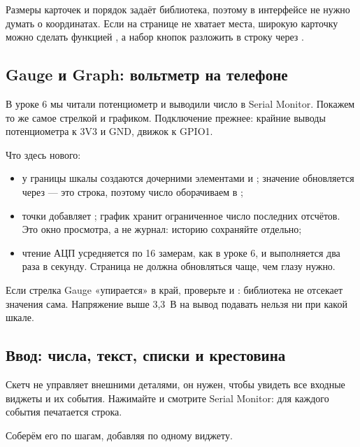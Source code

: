 Размеры карточек и порядок задаёт библиотека, поэтому в интерфейсе не нужно думать о
координатах. Если на странице не хватает места, широкую карточку можно сделать функцией
, а набор кнопок разложить в строку через .

\subsection{Gauge и Graph: вольтметр на телефоне}

В уроке 6 мы читали потенциометр и выводили число в Serial Monitor. Покажем то же самое
стрелкой и графиком. Подключение прежнее: крайние выводы потенциометра к 3V3 и GND,
движок к GPIO1.


Что здесь нового:
\begin{itemize}[leftmargin=*]
  \item у  границы шкалы создаются дочерними элементами  и ;
        значение обновляется через  --- это строка, поэтому число
        оборачиваем в ;
  \item точки  добавляет ; график хранит ограниченное число
        последних отсчётов. Это окно просмотра, а не журнал: историю сохраняйте отдельно;
  \item чтение АЦП усредняется по 16 замерам, как в уроке 6, и выполняется два раза в секунду.
        Страница не должна обновляться чаще, чем глазу нужно.
\end{itemize}

\begin{tip}
Если стрелка Gauge «упирается» в край, проверьте  и : библиотека
не отсекает значения сама. Напряжение выше 3,3~В на вывод подавать нельзя ни при какой шкале.
\end{tip}

\subsection{Ввод: числа, текст, списки и крестовина}

Скетч  не управляет внешними деталями, он нужен, чтобы увидеть все входные
виджеты и их события. Нажимайте и смотрите Serial Monitor: для каждого события печатается строка.

Соберём его по шагам, добавляя по одному виджету.

